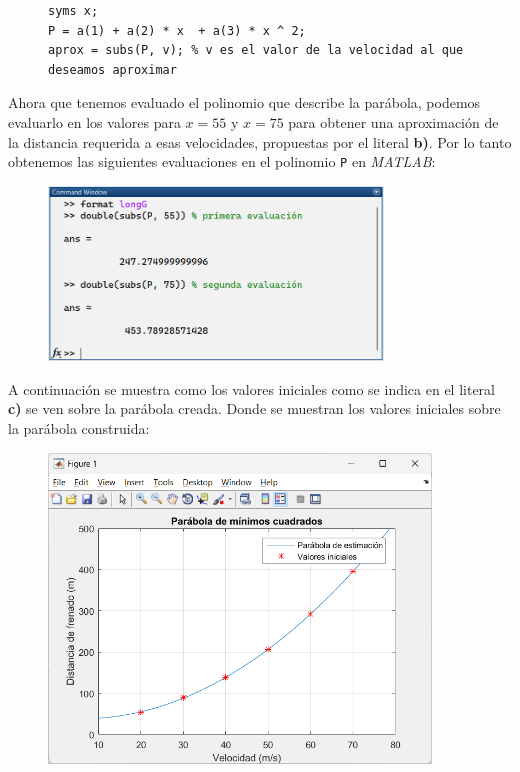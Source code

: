 \documentclass[11pt,letterpaper]{article}
\begin{document}
\begin{figure}[H]
\begin{tcolorbox}[title=Problema 4: Implementación en MATLAB]
\begin{verbatim}
syms x;
P = a(1) + a(2) * x  + a(3) * x ^ 2;
aprox = subs(P, v); % v es el valor de la velocidad al que deseamos aproximar
\end{verbatim}
\end{tcolorbox}
\end{figure}
Ahora que tenemos evaluado el polinomio que describe la parábola, podemos evaluarlo en los valores para $x=55$ y $x=75$ para obtener una aproximación de la distancia requerida a esas velocidades, propuestas por el literal \textbf{b)}. Por lo tanto obtenemos las siguientes evaluaciones en el polinomio \texttt{P} en \textit{MATLAB}:
\begin{figure}[H]
\centering
\includegraphics[width=3.5in]{res4.png}
\end{figure}
A continuación se muestra como los valores iniciales como se indica en el literal \textbf{c)} se ven sobre la parábola creada. Donde se muestran los valores iniciales sobre la parábola construida:
\begin{figure}[H]
\centering
\includegraphics[width=4in]{parab4.png}
\end{figure}
\end{document}
